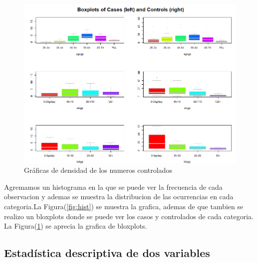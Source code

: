 \documentclass[12pt,a4paper]{article}
\begin{document}
\begin{figure}
	\centering
	\includegraphics[scale = 0.65]{castrols1.png}
	\caption{Gráficas de densidad de los numeros controlados} \label{fig:castrols1}
\end{figure}
Agremamos un histograma en la que se puede ver la frecuencia de cada observacion y ademas se muestra la distribucion de las ocurrencias en cada categoria.La Figura(\ref{fig:hist}) se muestra la grafica, ademas de que tambien se realizo un bloxplots donde se puede ver los casos y controlados de cada categoria. La Figura(\ref{fig:castrols1}) se aprecia la grafica de bloxplots.\citep{repositorio}

\subsection{Estadística descriptiva de dos variables} \label{subsec:estadisticadescriptivados}
\end{document}
